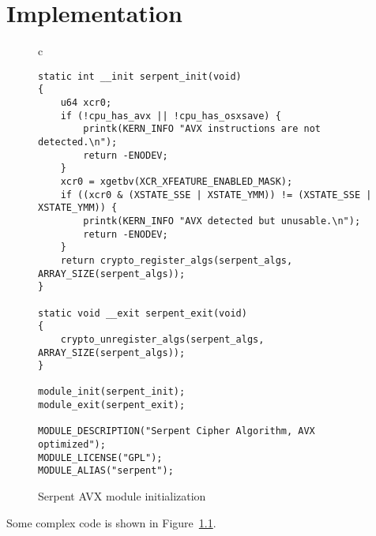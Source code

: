 %
% 


\chapter{Implementation}
\label{sec:implementation}


\Blindtext[5][2]

\begin{figure}
\centering
\begin{tabular}{c}
\begin{lstlisting}
static int __init serpent_init(void)
{
    u64 xcr0;
    if (!cpu_has_avx || !cpu_has_osxsave) {
        printk(KERN_INFO "AVX instructions are not detected.\n");
        return -ENODEV;
    }
    xcr0 = xgetbv(XCR_XFEATURE_ENABLED_MASK);
    if ((xcr0 & (XSTATE_SSE | XSTATE_YMM)) != (XSTATE_SSE | XSTATE_YMM)) {
        printk(KERN_INFO "AVX detected but unusable.\n");
        return -ENODEV;
    }
    return crypto_register_algs(serpent_algs, ARRAY_SIZE(serpent_algs));
}

static void __exit serpent_exit(void)
{
    crypto_unregister_algs(serpent_algs, ARRAY_SIZE(serpent_algs));
}

module_init(serpent_init);
module_exit(serpent_exit);

MODULE_DESCRIPTION("Serpent Cipher Algorithm, AVX optimized");
MODULE_LICENSE("GPL");
MODULE_ALIAS("serpent");
\end{lstlisting}
\end{tabular}
\caption{Serpent AVX module initialization}
\label{fig:serpent_init}
\end{figure}

Some complex code is shown in Figure~\ref{fig:serpent_init}. \blindtext


